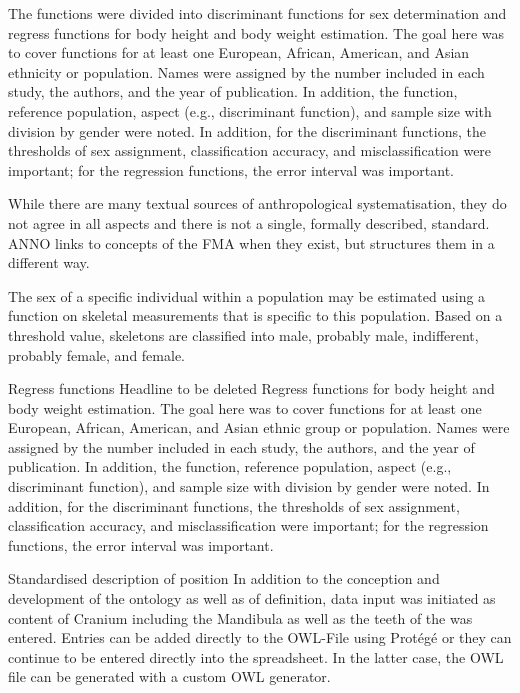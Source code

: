 \documentclass[sw]{iosart2x}
\begin{document}
The functions were divided into discriminant functions for sex determination and regress functions for body height and body weight estimation.
The goal here was to cover functions for at least one European, African, American, and Asian ethnicity or population.
Names were assigned by the number included in each study, the authors, and the year of publication.
In addition, the function, reference population, aspect (e.g., discriminant function), and sample size with division by gender were noted.
In addition, for the discriminant functions, the thresholds of sex assignment, classification accuracy, and misclassification were important; for the regression functions, the error interval was important.

While there are many textual sources of anthropological systematisation, they do not agree in all aspects and there is not a single, formally described, standard.
ANNO links to concepts of the FMA when they exist, but structures them in a different way.

The sex of a specific individual within a population may be estimated using a function on skeletal measurements that is specific to this population.
Based on a threshold value, skeletons are classified into male, probably male, indifferent, probably female, and female.

Regress functions Headline to be deleted 
Regress functions for body height and body weight estimation.
The goal here was to cover functions for at least one European, African, American, and Asian ethnic group or population.
Names were assigned by the number included in each study, the authors, and the year of publication.
In addition, the function, reference population, aspect (e.g., discriminant function), and sample size with division by gender were noted.
In addition, for the discriminant functions, the thresholds of sex assignment, classification accuracy, and misclassification were important; for the regression functions, the error interval was important.


Standardised description of position 
In addition to the conception and development of the ontology as well as of definition, data input was initiated as content of Cranium including the Mandibula as well as the teeth of the was entered. Entries can be added directly to the OWL-File using Protégé or they can continue to be entered directly into the spreadsheet. In the latter case, the OWL file can be generated with a custom OWL generator.
\end{document}
